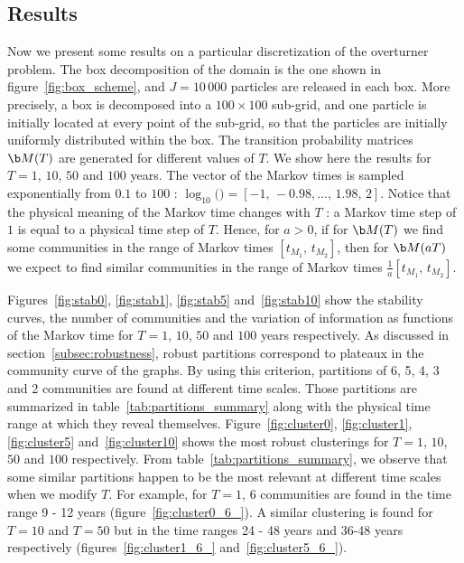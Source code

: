 \subsection{Results}
Now we present some results on a particular discretization of the overturner problem. The box decomposition of the domain is the one shown in figure~\ref{fig:box_scheme}, and $J = 10\,000$ particles are released in each box. More precisely, a box is decomposed into a $100 \times 100$ sub-grid, and one particle is initially located at every point of the sub-grid, so that the particles are initially uniformly distributed within the box. The transition probability matrices $\b M(T)$ are generated for different values of $T$. We show here the results for $T = 1$, $10$, $50$ and $100$ years. The vector of the Markov times  is sampled exponentially from $0.1$ to $100$ : $\log_{10}($$) = [-1,\, -0.98, \dots ,\, 1.98,\, 2]$. Notice that the physical meaning of the Markov time changes with $T$ : a Markov time step of $1$ is equal to a physical time step of $T$. Hence, for $a >0$, if for $\b M(T)$ we find some communities in the range of Markov times $[t_{M_1},\, t_{M_2}]$, then for $\b M(aT)$ we expect to find similar communities in the range of Markov times $\frac{1}{a}[t_{M_1},\, t_{M_2}]$.

% 	

Figures~\ref{fig:stab0}, \ref{fig:stab1}, \ref{fig:stab5} and~\ref{fig:stab10} show the stability curves, the number of communities and the variation of information as functions of the Markov time for $T = 1$, $10$, $50$ and $100$ years respectively. As discussed in section~\ref{subsec:robustness}, robust partitions correspond to plateaux in the community curve of the graphs. By using this criterion, partitions of 6, 5, 4, 3 and 2 communities are found at different time scales. Those partitions are summarized in table~\ref{tab:partitions_summary} along with the physical time range at which they reveal themselves. Figure~\ref{fig:cluster0}, \ref{fig:cluster1}, \ref{fig:cluster5} and~\ref{fig:cluster10} shows the most robust clusterings for $T=1$, $10$, $50$ and $100$ respectively. From table~\ref{tab:partitions_summary}, we observe that some similar partitions happen to be the most relevant at different time scales when we modify $T$. For example, for $T=1$, 6 communities are found in the time range 9 - 12 years (figure~\ref{fig:cluster0_6_}). A similar clustering is found for $T = 10$ and $T = 50$ but in the time ranges 24 - 48 years and 36-48 years respectively (figures~\ref{fig:cluster1_6_} and~\ref{fig:cluster5_6_}).

